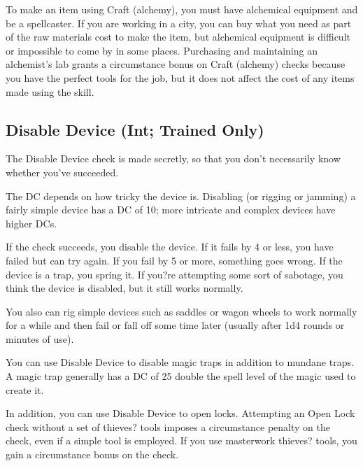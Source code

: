 \par To make an item using Craft (alchemy), you must have alchemical equipment and be a spellcaster. If you are working in a city, you can buy what you need as part of the raw materials cost to make the item, but alchemical equipment is difficult or impossible to come by in some places. Purchasing and maintaining an alchemist's lab grants a  circumstance bonus on Craft (alchemy) checks because you have the perfect tools for the job, but it does not affect the cost of any items made using the skill.

\subsection{Disable Device (Int; Trained Only)}
 The Disable Device check is made secretly, so that you don't necessarily know whether you've succeeded.

The DC depends on how tricky the device is. Disabling (or rigging or jamming) a fairly simple device has a DC of 10; more intricate and complex devices have higher DCs.

If the check succeeds, you disable the device. If it fails by 4 or less, you have failed but can try again. If you fail by 5 or more, something goes wrong. If the device is a trap, you spring it. If you?re attempting some sort of sabotage, you think the device is disabled, but it still works normally.

You also can rig simple devices such as saddles or wagon wheels to work normally for a while and then fail or fall off some time later (usually after 1d4 rounds or minutes of use).

\par You can use Disable Device to disable magic traps in addition to mundane traps. A magic trap generally has a DC of 25 \add double the spell level of the magic used to create it.

\par In addition, you can use Disable Device to open locks. Attempting an Open Lock check without a set of thieves? tools imposes a  circumstance penalty on the check, even if a simple tool is employed. If you use masterwork thieves? tools, you gain a  circumstance bonus on the check.


